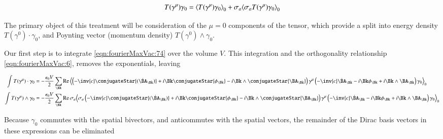 \begin{align}\label{eqn:fourierMaxVac:74}
T(\gamma^\mu) \gamma_0 = {\left\langle{{T(\gamma^\mu) \gamma_0}}\right\rangle}_{0} + \sigma_a {\left\langle{{ \sigma_a T(\gamma^\mu) \gamma_0 }}\right\rangle}_{0}
\end{align}

The primary object of this treatment will be consideration of the $\mu = 0$ components of the tensor, which provide a split into energy density $T(\gamma^0) \cdot \gamma_0$, and Poynting vector (momentum density) $T(\gamma^0) \wedge \gamma_0$.

Our first step is to integrate \autoref{eqn:fourierMaxVac:74} over the volume $V$.  This integration and the orthogonality relationship \autoref{eqn:fourierMaxVac:6}, removes the exponentials, leaving

\begin{subequations}
\label{eqn:fourierMaxVac:75}
\begin{align}
\int T(\gamma^\mu) \cdot \gamma_0
&= -\frac{\epsilon_0 V}{2} \sum_{\Bk}
\Real \gpgradezero{
\left( -\inv{c} \conjugateStar{(\dot{\BA}_{\Bk})} + i \Bk \conjugateStar{\phi_{\Bk}} - i \Bk \wedge \conjugateStar{\BA_{\Bk}} \right) 
\gamma^\mu 
\left( -\inv{c} \dot{\BA}_\Bk - i \Bk \phi_\Bk + i \Bk \wedge \BA_\Bk \right) 
\gamma_0 } \\
\int T(\gamma^\mu) \wedge \gamma_0
&= -\frac{\epsilon_0 V}{2} \sum_{\Bk}
\Real \sigma_a \gpgradezero{ \sigma_a
\left( -\inv{c} \conjugateStar{(\dot{\BA}_{\Bk})} + i \Bk \conjugateStar{\phi_{\Bk}} - i \Bk \wedge \conjugateStar{\BA_{\Bk}} \right) 
\gamma^\mu 
\left( -\inv{c} \dot{\BA}_\Bk - i \Bk \phi_\Bk + i \Bk \wedge \BA_\Bk \right) \gamma_0
} 
\end{align}
\end{subequations}

Because $\gamma_0$ commutes with the spatial bivectors, and anticommutes with the spatial vectors, the remainder of the Dirac basis vectors in these expressions can be eliminated

